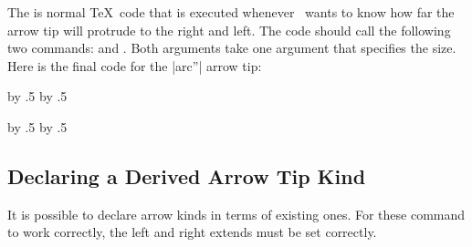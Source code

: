 \begin{command}{\pgfarrowsdeclare{}}
  

  The  is normal \TeX\ code that is executed
  whenever \pgfname\ wants to know how far the arrow tip will protrude
  to the right and left. The code should call the following two
  commands: \declare{|\pgfarrowsrightextend|} and
  \declare{|\pgfarrowsleftextend|}. Both arguments take one argument
  that specifies the size. Here is the final code for the |arc''| arrow
  tip: 
\begin{codeexample}[]
{
  \arrowsize=0.2pt
  \advance\arrowsize by .5\pgflinewidth
  \pgfarrowsleftextend{-4\arrowsize-.5\pgflinewidth}
  \pgfarrowsrightextend{.5\pgflinewidth}
}
{
  \arrowsize=0.2pt
  \advance\arrowsize by .5\pgflinewidth
  \pgfsetdash{}{0pt} %
  \pgfsetroundjoin   %
  \pgfsetroundcap    %
  \pgfpathmoveto{\pgfpoint{-4\arrowsize}{4\arrowsize}}
  \pgfusepathqstroke
  \pgfpathmoveto{\pgfpointorigin}
  \pgfusepathqstroke
}
\end{codeexample}
\end{command}

{
  \arrowsize=0.2pt
  \advance\arrowsize by .5\pgflinewidth
  \pgfarrowsleftextend{-4\arrowsize-.5\pgflinewidth}
  \pgfarrowsrightextend{.5\pgflinewidth}
}
{
  \arrowsize=0.2pt
  \advance\arrowsize by .5\pgflinewidth
  \pgfsetdash{}{0pt} %
  \pgfsetroundjoin   %
  \pgfsetroundcap    %
  \pgfpathmoveto{\pgfpoint{-4\arrowsize}{4\arrowsize}}
  \pgfusepathqstroke
  \pgfpathmoveto{\pgfpointorigin}
  \pgfusepathqstroke
}


\subsection{Declaring a Derived Arrow Tip Kind}

It is possible to declare arrow kinds in terms of existing ones. For
these command to work correctly, the left and right extends must be
set correctly.

